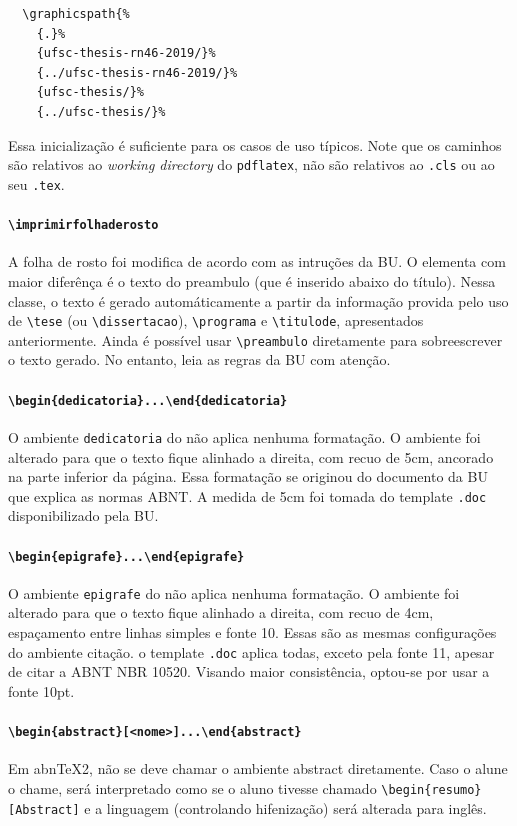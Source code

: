 \documentclass[embeddedlogo]{../ufsc-thesis-rn46-2019}
\newcommand{\lacmd}[1]{\texttt{\textbackslash{}#1}}
\newcommand{\laenv}[1]{\texttt{\textbackslash{}begin\{#1\}...\textbackslash{}end\{#1\}}}
\newcommand{\laenvi}[2]{\texttt{\textbackslash{}begin\{#1\}[#2]...\textbackslash{}end\{#1\}}}
\begin{document}
\begin{verbatim}
  \graphicspath{%
    {.}%
    {ufsc-thesis-rn46-2019/}%
    {../ufsc-thesis-rn46-2019/}%
    {ufsc-thesis/}%
    {../ufsc-thesis/}%
\end{verbatim}

Essa inicialização é suficiente para os casos de uso típicos. Note que os
caminhos são relativos ao \emph{working directory} do \texttt{pdflatex}, não são
relativos ao \texttt{.cls} ou ao seu \texttt{.tex}.

\paragraph*{\lacmd{imprimirfolhaderosto}} A folha de rosto foi modifica de
acordo com as intruções da BU. O elementa com maior diferênça é o texto do
preambulo (que é inserido abaixo do título). Nessa classe, o texto é gerado
automáticamente a partir da informação provida pelo uso de \lacmd{tese} (ou
\lacmd{dissertacao}), \lacmd{programa} e \lacmd{titulode}, apresentados
anteriormente. Ainda é possível usar \lacmd{preambulo} diretamente para
sobreescrever o texto gerado. No entanto, leia as regras da BU com atenção.

\paragraph*{\laenv{dedicatoria}}
O ambiente \texttt{dedicatoria} do \abnTeX não aplica nenhuma formatação. O
ambiente foi alterado para que o texto fique alinhado a direita, com recuo de
5cm, ancorado na parte inferior da página. Essa formatação se originou do
documento da BU que explica as normas ABNT. A medida de 5cm foi tomada do
template \texttt{.doc} disponibilizado pela BU.

\paragraph*{\laenv{epigrafe}}
O ambiente \texttt{epigrafe} do \abnTeX não aplica nenhuma formatação. O
ambiente foi alterado para que o texto fique alinhado a direita, com recuo de
4cm, espaçamento entre linhas simples e fonte 10. Essas são as mesmas
configurações do ambiente citação. o template \texttt{.doc} aplica todas, exceto
pela fonte 11, apesar de citar a ABNT NBR 10520. Visando maior consistência,
optou-se por usar a fonte 10pt.

\paragraph*{\laenvi{abstract}{<nome>}}
Em abnTeX2, não se deve chamar o ambiente abstract diretamente. Caso o alune o
chame, será interpretado como se o aluno tivesse chamado
\lacmd{begin\{resumo\}[Abstract]} e a linguagem (controlando hifenização) será
alterada para inglês.
\end{document}
